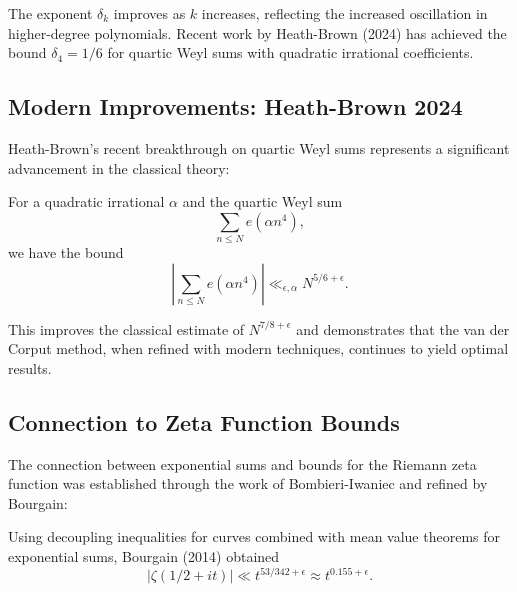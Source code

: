 \begin{remark}
The exponent $\delta_k$ improves as $k$ increases, reflecting the increased oscillation in higher-degree polynomials. Recent work by Heath-Brown (2024) \cite{heathbrown2024} has achieved the bound $\delta_4 = 1/6$ for quartic Weyl sums with quadratic irrational coefficients.
\end{remark}

\subsection{Modern Improvements: Heath-Brown 2024}

Heath-Brown's recent breakthrough on quartic Weyl sums represents a significant advancement in the classical theory:

\begin{theorem}
For a quadratic irrational $\alpha$ and the quartic Weyl sum
\begin{equation}
\sum_{n \leq N} e(\alpha n^4),
\end{equation}
we have the bound
\begin{equation}
\left| \sum_{n \leq N} e(\alpha n^4) \right| \ll_{\epsilon,\alpha} N^{5/6 + \epsilon}.
\end{equation}
\end{theorem}

This improves the classical estimate of $N^{7/8 + \epsilon}$ and demonstrates that the van der Corput method, when refined with modern techniques, continues to yield optimal results.

\subsection{Connection to Zeta Function Bounds}

The connection between exponential sums and bounds for the Riemann zeta function was established through the work of Bombieri-Iwaniec and refined by Bourgain:

\begin{theorem}
Using decoupling inequalities for curves combined with mean value theorems for exponential sums, Bourgain (2014) obtained
\begin{equation}
|\zeta(1/2 + it)| \ll t^{53/342 + \epsilon} \approx t^{0.155 + \epsilon}.
\end{equation}
\end{theorem}

